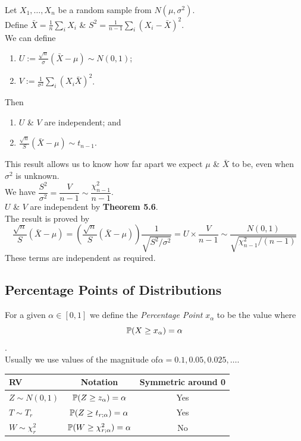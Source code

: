 \documentclass[11pt,a4paper]{article}
\begin{document}
\theorem{}
Let $X_1,\dots,X_n$ be a random sample from $N(\mu,\sigma^2)$.\\
Define $\bar{X}=\frac{1}{n}\sum_iX_i$ \& $S^2=\frac{1}{n-1}\sum_i(X_i-\bar{X})^2$.\\
We can define
\begin{enumerate}[label=\roman*)]
	\item $U:=\frac{\sqrt{n}}{\sigma}(\bar{X}-\mu)\sim N(0,1)$;
	\item $V:=\frac{1}{\sigma^2}\sum_i(X_i\bar{X})^2$.
\end{enumerate}
Then
\begin{enumerate}
	\item $U$ \& $V$ are independent; and
	\item $\frac{\sqrt{n}}{S}(\bar{X}-\mu)\sim t_{n-1}$.
\end{enumerate}
This result allows us to know how far apart we expect $\mu$ \& $\bar{X}$ to be, even when $\sigma^2$ is unknown.\\

We have $\dfrac{S^2}{\sigma^2}=\dfrac{V}{n-1}\sim\dfrac{\chi_{n-1}^2}{n-1}$.\\
$U$ \& $V$ are independent by \textbf{Theorem 5.6}.\\
The result is proved by
$$\frac{\sqrt{n}}{S}(\bar{X}-\mu)=\left(\frac{\sqrt{n}}{S}(\bar{X}-\mu)\right)\frac{1}{\sqrt{S^2/\sigma^2}}=U\times\frac{V}{n-1}\sim \frac{N(0,1)}{\sqrt{\chi_{n-1}^2/(n-1)}}$$
These terms are independent as required.

\subsection{Percentage Points of Distributions}

For a given $\alpha\in[0,1]$ we define the \textit{Percentage Point} $x_\alpha$ to be the value where
$$\mathbb{P}(X\geq x_\alpha)=\alpha$$.\\
\nb Usually we use values of the magnitude of$\alpha=0.1,0.05,0.025,\dots$.\\

\begin{tabular}{|l|c|c|}
\hline
RV&Notation&Symmetric around 0\\
\hline
$Z\sim N(0,1)$&$\mathbb{P}(Z\geq z_\alpha)=\alpha$&Yes\\
$T\sim T_r$&$\mathbb{P}(Z\geq t_{r;\alpha})=\alpha$&Yes\\
$W\sim\chi_r^2$&$\mathbb{P}(W\geq \chi^2_{r;\alpha})=\alpha$&No\\
\hline
\end{tabular}
\\
\end{document}
